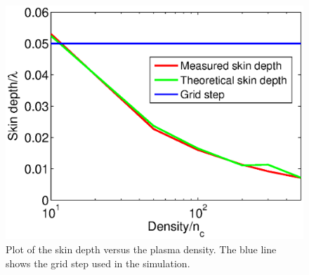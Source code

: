 \documentclass[conference]{IEEEtran}
\renewcommand{\~}{\widetilde }
\begin{document}
\begin{figure}[H]
		\begin{center}
			\includegraphics[width=1.0\columnwidth]{SkinDepths.eps}
			\caption{Plot of the skin depth versus the plasma density. The blue line shows the grid step used in the simulation.}
			\label{skindepths}
		\end{center}
\end{figure}
\end{document}
